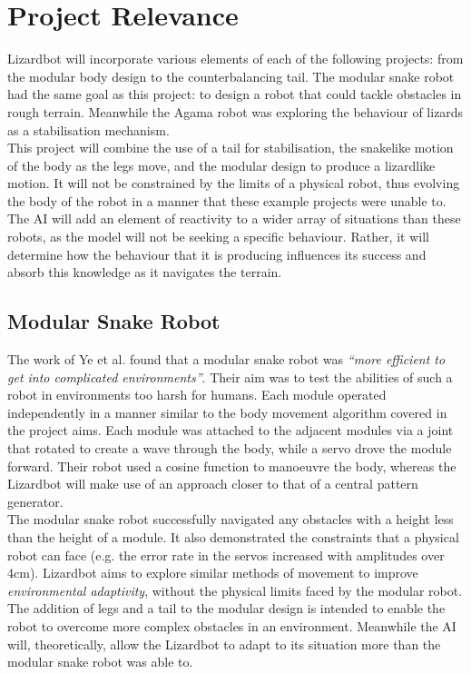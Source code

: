 \documentclass{article}
\begin{document}
\section{Project Relevance}
Lizardbot will incorporate various elements of each of the following projects: from the modular body design to the counterbalancing tail. The modular snake robot had the same goal as this project: to design a robot that could tackle obstacles in rough terrain. Meanwhile the Agama robot was exploring the behaviour of lizards as a stabilisation mechanism.\\
This project will combine the use of a tail for stabilisation, the snakelike motion of the body as the legs move, and the modular design to produce a lizardlike motion. It will not be constrained by the limits of a physical robot, thus evolving the body of the robot in a manner that these example projects were unable to. The AI will add an element of reactivity to a wider array of situations than these robots, as the model will not be seeking a specific behaviour. Rather, it will determine how the behaviour that it is producing influences its success and absorb this knowledge as it navigates the terrain.
\subsection{Modular Snake Robot}
The work of Ye et al.  found that a modular snake robot was \textit{“more efficient to get into complicated environments”}. Their aim was to test the abilities of such a robot in environments too harsh for humans. Each module operated independently in a manner similar to the body movement algorithm covered in the project aims. Each module was attached to the adjacent modules via a joint that rotated to create a wave through the body, while a servo drove the module forward. Their robot used a cosine function to manoeuvre the body, whereas the Lizardbot will make use of an approach closer to that of a central pattern generator. \\
The modular snake robot successfully navigated any obstacles with a height less than the height of a module. It also demonstrated the constraints that a physical robot can face (e.g. the error rate in the servos increased with amplitudes over 4cm). Lizardbot aims to explore similar methods of movement to improve \textit{environmental adaptivity}, without the physical limits faced by the modular robot. The addition of legs and a tail to the modular design is intended to enable the robot to overcome more complex obstacles in an environment. Meanwhile the AI will, theoretically, allow the Lizardbot to adapt to its situation more than the modular snake robot was able to.
\end{document}
